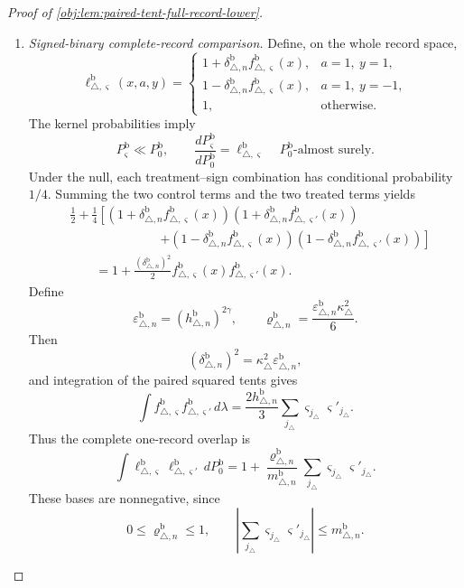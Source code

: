 \begin{proof}[Proof of \cref{obj:lem:paired-tent-full-record-lower}]
\begin{enumerate}
\item \emph{Signed-binary complete-record comparison.}
Define, on the whole record space,
\[
\ell_{\triangle,\varsigma}^{\mathrm b}(x,a,y)=
\begin{cases}
1+\delta_{\triangle,n}^{\mathrm b}
f_{\triangle,\varsigma}^{\mathrm b}(x),&a=1,\ y=1,\\
1-\delta_{\triangle,n}^{\mathrm b}
f_{\triangle,\varsigma}^{\mathrm b}(x),&a=1,\ y=-1,\\
1,&\text{otherwise}.
\end{cases}
\]
The kernel probabilities imply
\[
P_\varsigma^{\mathrm b}\ll P_0^{\mathrm b},
\qquad
\frac{dP_\varsigma^{\mathrm b}}{dP_0^{\mathrm b}}
=\ell_{\triangle,\varsigma}^{\mathrm b}
\quad P_0^{\mathrm b}\text{-almost surely}.
\]
Under the null, each treatment--sign combination has conditional probability
\(1/4\). Summing the two control terms and the two treated terms yields
\[
\begin{aligned}
&\frac12+\frac14
\left[
(1+\delta_{\triangle,n}^{\mathrm b}f_{\triangle,\varsigma}^{\mathrm b}(x))
(1+\delta_{\triangle,n}^{\mathrm b}f_{\triangle,\varsigma'}^{\mathrm b}(x))
\right.\\[-2pt]
&\hspace{3cm}\left.
+
(1-\delta_{\triangle,n}^{\mathrm b}f_{\triangle,\varsigma}^{\mathrm b}(x))
(1-\delta_{\triangle,n}^{\mathrm b}f_{\triangle,\varsigma'}^{\mathrm b}(x))
\right]\\
&\qquad=
1+\frac{(\delta_{\triangle,n}^{\mathrm b})^2}{2}
f_{\triangle,\varsigma}^{\mathrm b}(x)
f_{\triangle,\varsigma'}^{\mathrm b}(x).
\end{aligned}
\]
Define
\[
\varepsilon_{\triangle,n}^{\mathrm b}
=(h_{\triangle,n}^{\mathrm b})^{2\gamma},
\qquad
\varrho_{\triangle,n}^{\mathrm b}
=\frac{\varepsilon_{\triangle,n}^{\mathrm b}\kappa_\triangle^2}{6}.
\]
Then
\[
(\delta_{\triangle,n}^{\mathrm b})^2
=\kappa_\triangle^2\varepsilon_{\triangle,n}^{\mathrm b},
\]
and integration of the paired squared tents gives
\[
\int f_{\triangle,\varsigma}^{\mathrm b}
f_{\triangle,\varsigma'}^{\mathrm b}\,d\lambda
=
\frac{2h_{\triangle,n}^{\mathrm b}}3
\sum_{j_\triangle}
\varsigma_{j_\triangle}\varsigma'_{j_\triangle}.
\]
Thus the complete one-record overlap is
\[
\int
\ell_{\triangle,\varsigma}^{\mathrm b}
\ell_{\triangle,\varsigma'}^{\mathrm b}\,dP_0^{\mathrm b}
=
1+\frac{\varrho_{\triangle,n}^{\mathrm b}}{m_{\triangle,n}^{\mathrm b}}
\sum_{j_\triangle}\varsigma_{j_\triangle}\varsigma'_{j_\triangle}.
\]
These bases are nonnegative, since
\[
0\le\varrho_{\triangle,n}^{\mathrm b}\le1,
\qquad
\left|\sum_{j_\triangle}
\varsigma_{j_\triangle}\varsigma'_{j_\triangle}\right|
\le m_{\triangle,n}^{\mathrm b}.
\]


\end{enumerate}
\end{proof}
